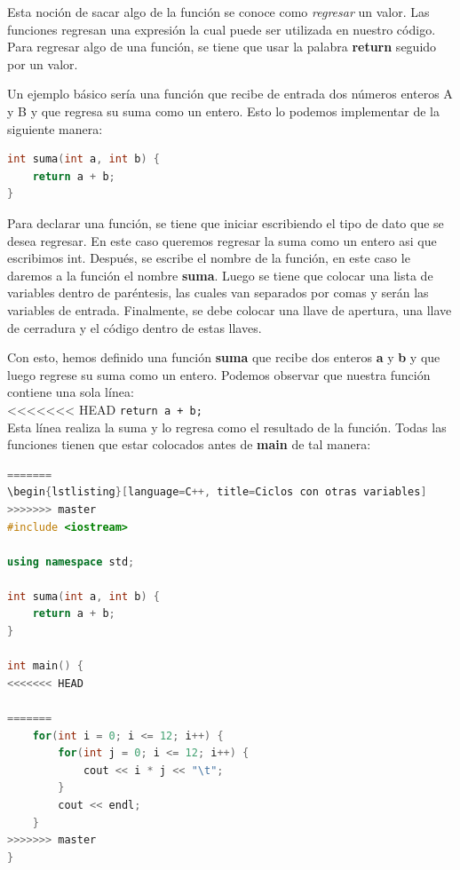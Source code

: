 \documentclass{article}
\begin{document}
Esta noción de sacar algo de la función se conoce como \textit{regresar} un valor. Las funciones regresan una expresión la cual puede ser utilizada en nuestro código. Para regresar algo de una función, se tiene que usar la palabra \textbf{return} seguido por un valor.

Un ejemplo básico sería una función que recibe de entrada dos números enteros A y B y que regresa su suma como un entero. Esto lo podemos implementar de la siguiente manera:

\begin{lstlisting}[language=C++, title=Función de suma]
int suma(int a, int b) {
	return a + b;
}
\end{lstlisting}

Para declarar una función, se tiene que iniciar escribiendo el tipo de dato que se desea regresar. En este caso queremos regresar la suma como un entero asi que escribimos int. Después, se escribe el nombre de la función, en este caso le daremos a la función el nombre \textbf{suma}. Luego se tiene que colocar una lista de variables dentro de paréntesis, las cuales van separados por comas y serán las variables de entrada. Finalmente, se debe colocar una llave de apertura, una llave de cerradura y el código dentro de estas llaves.

Con esto, hemos definido una función \textbf{suma} que recibe dos enteros \textbf{a} y \textbf{b} y que luego regrese su suma como un entero. Podemos observar que nuestra función contiene una sola línea: \\

<<<<<<< HEAD
\lstinline{return a + b;} \\

Esta línea realiza la suma y lo regresa como el resultado de la función. Todas las funciones tienen que estar colocados antes de \textbf{main} de tal manera:

\begin{lstlisting}[language=C++, title=Función de suma]
=======
\begin{lstlisting}[language=C++, title=Ciclos con otras variables]
>>>>>>> master
#include <iostream>

using namespace std;

int suma(int a, int b) {
	return a + b;
}

int main() {
<<<<<<< HEAD

=======
	for(int i = 0; i <= 12; i++) {
		for(int j = 0; i <= 12; i++) {
			cout << i * j << "\t";
		}
		cout << endl;
	}
>>>>>>> master
}
\end{lstlisting}
\end{document}
